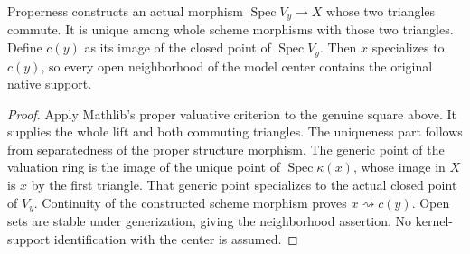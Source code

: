 \begin{theorem}
\label{scheme:proper-native-center}
\leanok
{}
Properness constructs an actual morphism $\operatorname{Spec}V_y\to X$
whose two triangles commute. It is unique among whole scheme morphisms
with those two triangles. Define $c(y)$ as its image of the closed point
of $\operatorname{Spec}V_y$. Then $x$ specializes to $c(y)$, so every
open neighborhood of the model center contains the original native support.
\end{theorem}
\begin{proof}
Apply Mathlib's proper valuative criterion to the genuine square above.
It supplies the whole lift and both commuting triangles. The uniqueness
part follows from separatedness of the proper structure morphism.
The generic point of the valuation ring is the image of the unique point
of $\operatorname{Spec}\kappa(x)$, whose image in $X$ is $x$ by the first
triangle. That generic point specializes to the actual closed point of
$V_y$. Continuity of the constructed scheme morphism proves
$x\rightsquigarrow c(y)$. Open sets are stable under generization, giving
the neighborhood assertion. No kernel-support identification with the
center is assumed.
\end{proof}


